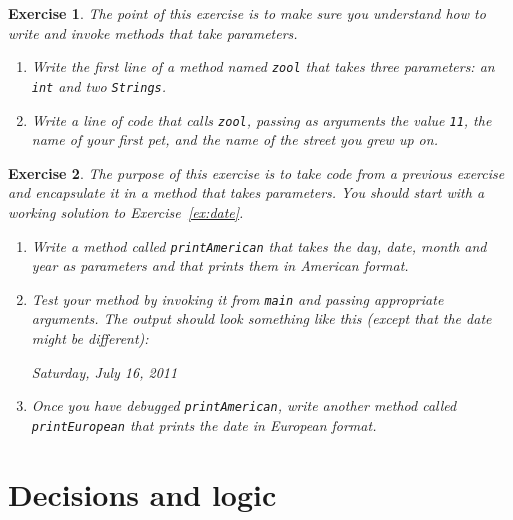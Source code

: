 \documentclass[12pt]{book}
\theoremstyle{exercise}
\newtheorem{exercise}{Exercise}[chapter]
\newcommand{\java}[1]{\lstinline{#1}} %
\begin{document}
\begin{exercise}

The point of this exercise is to make sure you understand how to write and invoke methods that take parameters.

\begin{enumerate}
\item Write the first line of a method named \java{zool} that takes three parameters: an \java{int} and two \java{Strings}.

\item Write a line of code that calls \java{zool}, passing as arguments the value \java{11}, the name of your first pet, and the name of the street you grew up on.
\end{enumerate}

\end{exercise}

\begin{exercise}

The purpose of this exercise is to take code from a previous exercise and encapsulate it in a method that takes parameters.
You should start with a working solution to Exercise~\ref{ex:date}.

\begin{enumerate}

\item Write a method called \java{printAmerican} that takes the day, date, month and year as parameters and that prints them in American format.

\item Test your method by invoking it from \java{main} and passing appropriate arguments.
The output should look something like this (except that the date might be different):

\begin{stdout}
Saturday, July 16, 2011
\end{stdout}

\item Once you have debugged \java{printAmerican}, write another method called \java{printEuropean} that prints the date in European format.

\end{enumerate}
\end{exercise}


\chapter{Decisions and logic}
\end{document}
